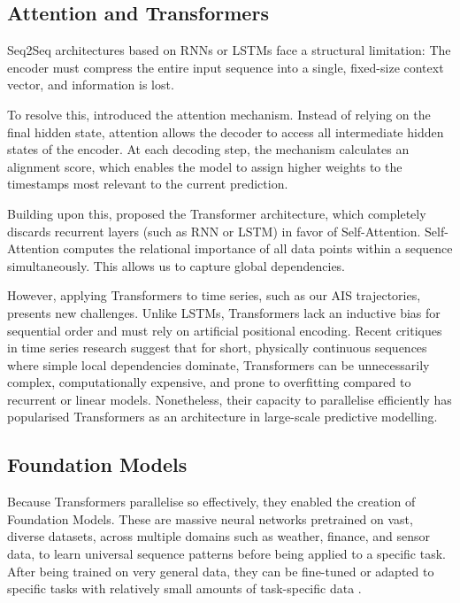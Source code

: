 \subsection{Attention and Transformers}
   \ac{Seq2Seq} architectures based on \acp{RNN} or \acp{LSTM} face a structural limitation: The encoder must compress the entire input sequence into a single, fixed-size context vector, and information is lost. %
    
    To resolve this, \textcite{bahdanau2016neuralmachinetranslationjointly} introduced the attention mechanism. Instead of relying on the final hidden state, attention allows the decoder to access all intermediate hidden states of the encoder. At each decoding step, the mechanism calculates an alignment score, which enables the model to assign higher weights to the timestamps most relevant to the current prediction.

    Building upon this, \textcite{attentioniayn} proposed the Transformer architecture, which completely discards recurrent layers (such as \ac{RNN} or \ac{LSTM}) in favor of Self-Attention. Self-Attention computes the relational importance of all data points within a sequence simultaneously. This allows us to capture global dependencies.

    However, applying Transformers to %
    time series, such as our \ac{AIS} trajectories, presents new challenges. Unlike \acp{LSTM}, Transformers lack an inductive bias for sequential order and must rely on artificial positional encoding. Recent critiques in time series research \parencite{zeng2022transformerseffectivetimeseries} suggest that for short, physically continuous sequences where simple local dependencies dominate, Transformers can be unnecessarily complex, computationally expensive, and prone to overfitting compared to recurrent or linear models. 
    Nonetheless, their capacity to parallelise efficiently has popularised Transformers as an architecture in large-scale predictive modelling. %

\subsection{Foundation Models}
\label{subsec:foundation}
    Because Transformers parallelise so effectively, they enabled the creation of Foundation Models. These are massive neural networks pretrained on vast, diverse datasets, across multiple domains such as weather, finance, and sensor data, to learn universal sequence patterns before being applied to a specific task. After being trained on very general data, they can be fine-tuned or adapted to specific tasks with relatively small amounts of task-specific data \parencite{Liang_2024foundation}.


